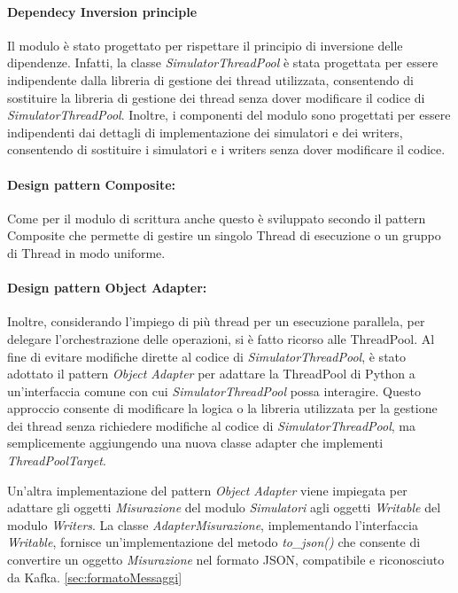 \begin{itemize}
\paragraph*{Dependecy Inversion principle}
Il modulo è stato progettato per rispettare il principio di inversione delle dipendenze. Infatti, la classe \textit{SimulatorThreadPool} è stata progettata per essere indipendente dalla libreria di gestione dei thread utilizzata, consentendo di sostituire la libreria di gestione dei thread senza dover modificare il codice di \textit{SimulatorThreadPool}.
Inoltre, i componenti del modulo sono progettati per essere indipendenti dai dettagli di implementazione dei simulatori e dei writers, consentendo di sostituire i simulatori e i writers senza dover modificare il codice.

\paragraph{Design pattern Composite:}
Come per il modulo di scrittura anche questo è sviluppato secondo il pattern Composite che permette di gestire un singolo Thread di esecuzione o un gruppo di Thread in modo uniforme.
\paragraph{Design pattern Object Adapter:}
Inoltre, considerando l'impiego di più thread per un esecuzione parallela, per delegare l'orchestrazione delle operazioni, si è fatto ricorso alle ThreadPool. Al fine di evitare modifiche dirette al codice di \textit{SimulatorThreadPool}, è stato adottato il pattern \textit{Object Adapter} per adattare la ThreadPool di Python a un'interfaccia comune con cui \textit{SimulatorThreadPool} possa interagire. Questo approccio consente di modificare la logica o la libreria utilizzata per la gestione dei thread senza richiedere modifiche al codice di \textit{SimulatorThreadPool}, ma semplicemente aggiungendo una nuova classe adapter che implementi \textit{ThreadPoolTarget}.


Un'altra implementazione del pattern \textit{Object Adapter} viene impiegata per adattare gli oggetti \textit{Misurazione} del modulo \textit{Simulatori} agli oggetti \textit{Writable} del modulo \textit{Writers}. La classe \textit{AdapterMisurazione}, implementando l'interfaccia \textit{Writable}, fornisce un'implementazione del metodo \textit{to\_json()} che consente di convertire un oggetto \textit{Misurazione} nel formato JSON, compatibile e riconosciuto da Kafka.
\ref*{sec:formatoMessaggi}



\end{itemize}
